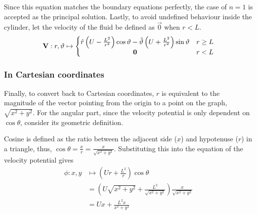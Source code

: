 Since this equation matches the boundary equations perfectly, the case of $n=1$ is accepted as the principal solution. Lastly, to avoid undefined behaviour inside the cylinder, let the velocity of the fluid be defined as $\vec{0}$ when $r<L$.
\begin{equation}\label{equation:VELOCITY:POLAR}
    \mathbf{V}:r,\vartheta\mapsto\left\{\begin{matrix}
        \hat{r}\left(U-\frac{L^2}{r^{2}}\right)\cos\vartheta-\hat{\vartheta}\left(U+\frac{L^2}{r^{2}}\right)\sin\vartheta&r\geq L\\
        \mathbf{0}&r<L
    \end{matrix}\right.
\end{equation}

\subsubsection{In Cartesian coordinates}\label{section:VELOCITY:CARTESIAN}
Finally, to convert back to Cartesian coordinates, $r$ is equivalent to the magnitude of the vector pointing from the origin to a point on the graph, $\sqrt{x^2+y^2}$. For the angular part, since the velocity potential is only dependent
on $\cos\theta$, consider its geometric definition. 
\begin{center}        
\end{center}
Cosine is defined as the ratio between the adjacent side ($x$) and hypotenuse ($r$) in a triangle, thus, $\cos\theta=\frac{x}{r}=\frac{x}{\sqrt{x^2+y^2}}$. Substituting this into the equation of the velocity potential gives
\begin{align*}
    \phi:x,y&\mapsto\left(Ur+\frac{L^2}{r}\right)\cos\theta\\
    &=\left(U\sqrt{x^2+y^2}+\frac{L^2}{\sqrt{x^2+y^2}}\right)\frac{x}{\sqrt{x^2+y^2}}\\
    &=Ux+\frac{L^2x}{x^2+y^2}
\end{align*}
